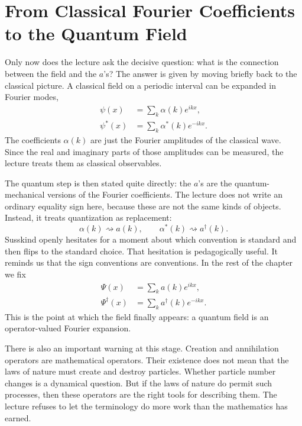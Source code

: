 \section{From Classical Fourier Coefficients to the Quantum Field}

Only now does the lecture ask the decisive question: what is the connection between the field and the \(a\)'s? The answer is given by moving briefly back to the classical picture. A classical field on a periodic interval can be expanded in Fourier modes,
\begin{align}
\psi(x) &= \sum_k \alpha(k)e^{ikx},
\\
\psi^\ast(x) &= \sum_k \alpha^\ast(k)e^{-ikx}.
\end{align}
The coefficients \(\alpha(k)\) are just the Fourier amplitudes of the classical wave. Since the real and imaginary parts of those amplitudes can be measured, the lecture treats them as classical observables.

The quantum step is then stated quite directly: the \(a\)'s are the quantum-mechanical versions of the Fourier coefficients. The lecture does not write an ordinary equality sign here, because these are not the same kinds of objects. Instead, it treats quantization as replacement:
\begin{equation}
\alpha(k)\rightsquigarrow a(k),
\qquad
\alpha^\ast(k)\rightsquigarrow a^\dagger(k).
\end{equation}
Susskind openly hesitates for a moment about which convention is standard and then flips to the standard choice. That hesitation is pedagogically useful. It reminds us that the sign conventions are conventions. In the rest of the chapter we fix
\begin{align}
\Psi(x) &= \sum_k a(k)e^{ikx},
\\
\Psi^\dagger(x) &= \sum_k a^\dagger(k)e^{-ikx}.
\end{align}
This is the point at which the field finally appears: a quantum field is an operator-valued Fourier expansion.

There is also an important warning at this stage. Creation and annihilation operators are mathematical operators. Their existence does not mean that the laws of nature must create and destroy particles. Whether particle number changes is a dynamical question. But if the laws of nature do permit such processes, then these operators are the right tools for describing them. The lecture refuses to let the terminology do more work than the mathematics has earned.

